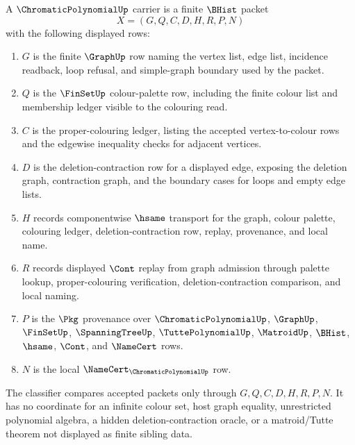 \begin{definition}
\label{def:chromatic-polynomial-carrier}
A $\ChromaticPolynomialUp$ carrier is a finite $\BHist$ packet
$$
X=(G,Q,C,D,H,R,P,N)
$$
with the following displayed rows:
\begin{enumerate}
\item $G$ is the finite $\GraphUp$ row naming the vertex list, edge list, incidence readback, loop refusal, and simple-graph boundary used by the packet.
\item $Q$ is the $\FinSetUp$ colour-palette row, including the finite colour list and membership ledger visible to the colouring read.
\item $C$ is the proper-colouring ledger, listing the accepted vertex-to-colour rows and the edgewise inequality checks for adjacent vertices.
\item $D$ is the deletion-contraction row for a displayed edge, exposing the deletion graph, contraction graph, and the boundary cases for loops and empty edge lists.
\item $H$ records componentwise $\hsame$ transport for the graph, colour palette, colouring ledger, deletion-contraction row, replay, provenance, and local name.
\item $R$ records displayed $\Cont$ replay from graph admission through palette lookup, proper-colouring verification, deletion-contraction comparison, and local naming.
\item $P$ is the $\Pkg$ provenance over $\ChromaticPolynomialUp$, $\GraphUp$, $\FinSetUp$, $\SpanningTreeUp$, $\TuttePolynomialUp$, $\MatroidUp$, $\BHist$, $\hsame$, $\Cont$, and $\NameCert$ rows.
\item $N$ is the local $\NameCert_{\ChromaticPolynomialUp}$ row.
\end{enumerate}
The classifier compares accepted packets only through $G,Q,C,D,H,R,P,N$. It has no coordinate for an infinite colour set, host graph equality, unrestricted polynomial algebra, a hidden deletion-contraction oracle, or a matroid/Tutte theorem not displayed as finite sibling data.
\end{definition}

